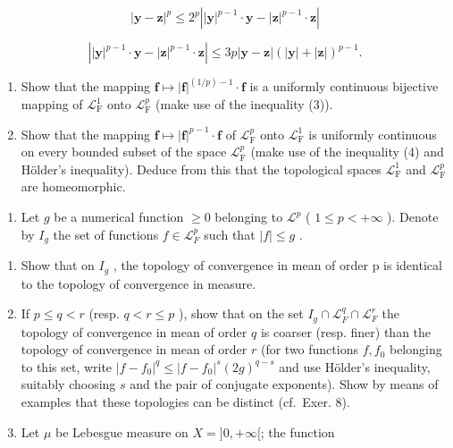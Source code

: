 \[
\left| \mathbf {y} - \mathbf {z} \right| ^ {p} \leqslant 2 ^ {p} \left| \left| \mathbf {y} \right| ^ {p - 1} \cdot \mathbf {y} - \left| \mathbf {z} \right| ^ {p - 1} \cdot \mathbf {z} \right|\tag{3}
\]

\[
\left| | \mathbf {y} | ^ {p - 1} \cdot \mathbf {y} - | \mathbf {z} | ^ {p - 1} \cdot \mathbf {z} \right| \leqslant 3 p | \mathbf {y} - \mathbf {z} | (| \mathbf {y} | + | \mathbf {z} |) ^ {p - 1}.\tag{4}
\]

\begin{enumerate}
\def\labelenumi{\alph{enumi})}
\setcounter{enumi}{1}
\item
  Show that the mapping \(\mathbf{f} \mapsto |\mathbf{f}|^{(1/p)-1} \cdot \mathbf{f}\) is a uniformly continuous bijective mapping of \(\mathcal{L}_{\mathrm{F}}^{1}\) onto \(\mathcal{L}_{\mathrm{F}}^{p}\) (make use of the inequality (3)).
\item
  Show that the mapping \(\mathbf{f} \mapsto |\mathbf{f}|^{p-1} \cdot \mathbf{f}\) of \(\mathcal{L}_{\mathrm{F}}^{p}\) onto \(\mathcal{L}_{\mathrm{F}}^{1}\) is uniformly continuous on every bounded subset of the space \(\mathcal{L}_{\mathrm{F}}^{p}\) (make use of the inequality (4) and Hölder's inequality). Deduce from this that the topological spaces \(\mathcal{L}_{\mathrm{F}}^{1}\) and \(\mathcal{L}_{\mathrm{F}}^{p}\) are homeomorphic.
\end{enumerate}

\begin{enumerate}
\def\labelenumi{\arabic{enumi})}
\setcounter{enumi}{10}
\tightlist
\item
  Let \(g\) be a numerical function \(\geqslant 0\) belonging to \(\mathcal{L}^p\) ( \(1 \leqslant p < +\infty\) ). Denote by \(I_g\) the set of functions \(f \in \mathcal{L}_F^p\) such that \(|f| \leqslant g\) .
\end{enumerate}

\begin{enumerate}
\def\labelenumi{\alph{enumi})}
\item
  Show that on \(I_{g}\) , the topology of convergence in mean of order p is identical to the topology of convergence in measure.
\item
  If \(p \leqslant q < r\) (resp. \(q < r \leqslant p\) ), show that on the set \(I_g \cap \mathcal{L}_F^q \cap \mathcal{L}_F^r\) the topology of convergence in mean of order \(q\) is coarser (resp. finer) than the topology of convergence in mean of order \(r\) (for two functions \(f, f_0\) belonging to this set, write \(|f - f_0|^q \leqslant |f - f_0|^s(2g)^{q-s}\) and use Hölder's inequality, suitably choosing \(s\) and the pair of conjugate exponents). Show by means of examples that these topologies can be distinct (cf.~Exer. 8).
\item
  Let \(\mu\) be Lebesgue measure on \(X = ]0, +\infty[\); the function
\end{enumerate}

